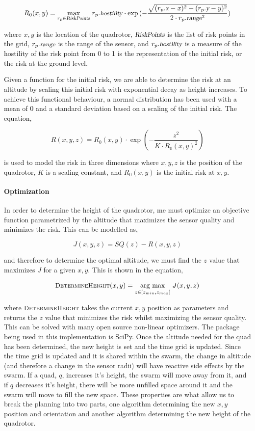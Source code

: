 \documentclass[12pt]{article}
\newcommand{\Function}[1]{\ensuremath{{\small \textsc{#1}}}}
\newcommand{\Var}[1]{\ensuremath{{\small{\textsl{#1}}}}}
\newcommand{\argmax}[1]{\underset{#1}{\operatorname{arg}\,\operatorname{max}}\;}
\newcommand{\Max}[1]{\underset{#1}{\operatorname{max}}\;}
\begin{document}
$$ R_0(x, y) = \Max{r_p \in \Var{RiskPoints}} r_p.\Var{hostility} \cdot
\exp{(-\frac{\sqrt{(r_p.\Var{x} - x)^2 + (r_p.\Var{y} - y)^2}}{
2 \cdot r_p.\Var{range}^2})}$$

where $x, y$ is the location of the quadrotor, $\Var{RiskPoints}$ is the list
of risk points in the grid, $r_p.\Var{range}$ is the range of the sensor, and
$r_p.\Var{hostility}$ is a measure of the hostility of the risk point from 0 to
1 is the representation of the initial risk, or the risk at the ground level.

Given a function for the initial risk, we are able to determine the risk at an
altitude by scaling this initial risk with exponential decay as height
increases. To achieve this functional behaviour, a normal distribution has been
used with a mean of 0 and a standard deviation based on a scaling of the
initial risk. The equation,

$$ R(x, y, z) = R_0(x, y) \cdot \exp{(-\frac{z^2}{K \cdot R_0(x, y)^2})} $$

is used to model the risk in three dimensions where $x, y, z$ is the position
of the quadrotor, $K$ is a scaling constant, and $R_0(x, y)$ is the initial
risk at $x, y$.

\paragraph{Optimization}

In order to determine the height of the quadrotor, me must optimize an
objective function parametrized by the altitude that maximizes the sensor
quality and minimizes the risk. This can be modelled as,

$$ J(x, y, z) = SQ(z) - R(x, y, z) $$

and therefore to determine the optimal altitude, we must find the $z$ value
that maximizes $J$ for a given $x, y$. This is shown in the equation,

$$ \Function{DetermineHeight}(x, y) = \argmax{z \in [z_{min}, z_{max}]} J(x, y,
z) $$

where $\Function{DetermineHeight}$ takes the current $x, y$ position as
parameters and returns the $z$ value that minimizes the risk whilst maximizing
the sensor quality.  This can be solved with many open source non-linear
optimizers.  The package being used in this implementation is SciPy.  Once the
altitude needed for the quad has been determined, the new height is set and the
time grid is updated.  Since the time grid is updated and it is shared within
the swarm, the change in altitude (and therefore a change in the sensor radii)
will have reactive side effects by the swarm.  If a quad, $q$, increases it's
height, the swarm will move away from it, and if $q$ decreases it's height,
there will be more unfilled space around it and the swarm will move to fill the
new space.  These properties are what allow us to break the planning into two
parts, one algorithm determining the new $x, y$ position and orientation and
another algorithm determining the new height of the quadrotor.
\end{document}
